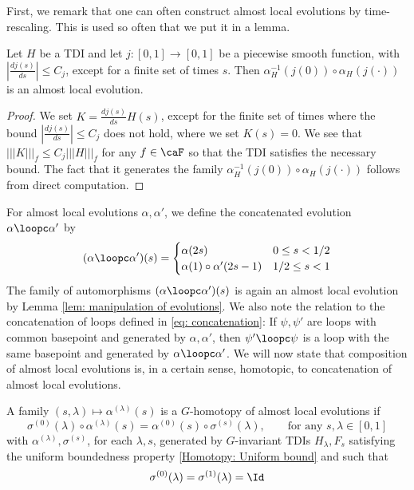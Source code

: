 First, we remark that one can often construct almost local evolutions by time-rescaling. This is used so often that we put it in a lemma.
\begin{lemma}\label{lem: time-rescaling almost local evolutions}
	Let $H$ be a TDI and let $j: [0,1]\to [0,1]$ be a piecewise smooth function, with  $|\frac{dj(s)}{ds}|\leq C_j$, except for a finite set of times $s$.  Then $\alpha^{-1}_H(j(0))\circ\alpha_H(j(\cdot))$ is an almost local evolution.  
\end{lemma}
\begin{proof}
	We set $K=\frac{d j(s)}{ds} H(s)$, except for the finite set of times where the bound $|\frac{dj(s)}{ds}|\leq C_j$ does not hold, where we set $K(s)=0$.
	We see that $|||K|||_f\leq C_j |||H|||_f $ for any $f\in \caF$ so that the TDI satisfies the necessary bound. The fact that it generates the family $\alpha^{-1}_H(j(0))\circ\alpha_H(j(\cdot))$  follows from direct computation.
\end{proof}
For almost local evolutions $\alpha,\alpha'$, we define the concatenated evolution $\alpha\loopc \alpha'$ 
by 
%
\begin{equation}\label{concatenation}
	(\alpha\loopc \alpha')(s)= \begin{cases} \alpha(2s) & 0\leq s <1/2 \\
		\alpha(1)\circ\alpha'(2s-1)   & 1/2\leq s <1   
	\end{cases}
\end{equation}
%
The family of automorphisms $(\alpha\loopc \alpha')(s)$ is again an almost local evolution by Lemma \ref{lem: manipulation of evolutions}.    
We also note the relation to the concatenation of loops defined in \eqref{eq: concatenation}:  If $\psi,\psi'$ are loops with common basepoint and generated by $\alpha,\alpha'$, then $\psi' \loopc \psi$ is a loop with the same basepoint and generated by $\alpha\loopc \alpha'$. 
We will now state that composition of almost local evolutions is, in a certain  sense, homotopic, to concatenation of almost local evolutions.
\begin{definition}\label{def: homo of ale}
	A family $(s,\lambda)\mapsto \alpha^{(\lambda)}(s)$ is a $G$-homotopy of almost local evolutions if 
	$$
	\sigma^{(0)}(\lambda) \circ \alpha^{(\lambda)}(s) 
	=  \alpha^{(0)}(s) \circ \sigma^{(s)}(\lambda)  ,\qquad \text{for any $s,\lambda \in [0,1]$}
	$$  
	with $\alpha^{(\lambda)},\sigma^{(s)}$, for each $\lambda,s$,  generated by $G$-invariant TDIs $H_\lambda, F_s$ satisfying the uniform boundedness property \eqref{Homotopy: Uniform bound} and such that 
	\begin{equation}\label{eq: extra condition homotopy}
		\sigma^{(0)}(\lambda)=\sigma^{(1)}(\lambda)=\Id
	\end{equation}
\end{definition}
